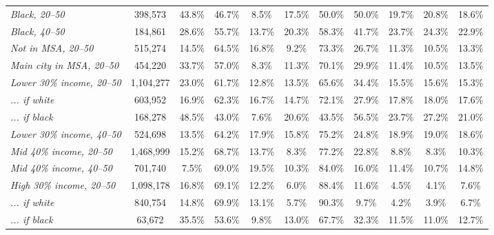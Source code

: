 \documentclass[12pt,letter]{article}
\begin{document}
\begin{landscape}
\begin{table}
\begin{center}
\begin{tabular}{|l|c|c|c|c|c||c|c|c|c|c|}
\emph{Black, 20--50} &  \footnotesize 398,573 & 43.8\% & 46.7\% &  8.5\% &  17.5\% & 50.0\% & 50.0\% & 19.7\% & 20.8\% & 18.6\% \\
\emph{Black, 40--50} &  \footnotesize 184,861 & 28.6\% & 55.7\% & 13.7\% &  20.3\% & 58.3\% & 41.7\% & 23.7\% & 24.3\% & 22.9\% \\\hline\hline
\emph{Not in MSA, 20--50} &  \footnotesize 515,274 & 14.5\% & 64.5\% & 16.8\% &   9.2\% & 73.3\% & 26.7\% & 11.3\% & 10.5\% & 13.3\% \\
\emph{Main city in MSA, 20--50} &  \footnotesize 454,220 & 33.7\% & 57.0\% &  8.3\% &  11.3\% & 70.1\% & 29.9\% & 11.4\% & 10.5\% & 13.5\% \\
\hline\hline
\emph{Lower 30\% income, 20--50} &  \footnotesize 1,104,277 & 23.0\% & 61.7\% & 12.8\% &  13.5\% & 65.6\% & 34.4\% & 15.5\% & 15.6\% & 15.3\% \\
\emph{... if white} &  \footnotesize 603,952 & 16.9\% & 62.3\% & 16.7\% &  14.7\% & 72.1\% & 27.9\% & 17.8\% & 18.0\% & 17.6\% \\
\emph{... if black} &  \footnotesize 168,278 & 48.5\% & 43.0\% &  7.6\% &  20.6\% & 43.5\% & 56.5\% & 23.7\% & 27.2\% & 21.0\% \\
\emph{Lower 30\% income, 40--50} &  \footnotesize  524,698 & 13.5\% & 64.2\% & 17.9\% &  15.8\% & 75.2\% & 24.8\% & 18.9\% & 19.0\% & 18.6\% \\\hline
\emph{Mid 40\% income, 20--50} &  \footnotesize 1,468,999 & 15.2\% & 68.7\% & 13.7\% &   8.3\% & 77.2\% & 22.8\% &  8.8\% &  8.3\% & 10.3\% \\
\emph{Mid 40\% income, 40--50} &  \footnotesize 701,740 &  7.5\% & 69.0\% & 19.5\% &  10.3\% & 84.0\% & 16.0\% & 11.4\% & 10.7\% & 14.8\% \\\hline
\emph{High 30\% income, 20--50} &  \footnotesize 1,098,178 & 16.8\% & 69.1\% & 12.2\% &   6.0\% & 88.4\% & 11.6\% &  4.5\% &  4.1\% &  7.6\% \\
\emph{... if white} &  \footnotesize 840,754 & 14.8\% & 69.9\% & 13.1\% &   5.7\% & 90.3\% &  9.7\% &  4.2\% &  3.9\% &  6.7\% \\
\emph{... if black} &  \footnotesize 63,672 & 35.5\% & 53.6\% &  9.8\% &  13.0\% & 67.7\% & 32.3\% & 11.5\% & 11.0\% & 12.7\% \\

\end{tabular}
\end{center}
\end{table}
\end{landscape}
\end{document}
